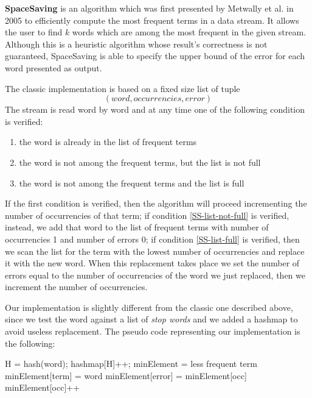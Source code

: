 \textbf{SpaceSaving} \cite{SS} is an algorithm which was first presented by Metwally et al.
in 2005 to efficiently compute the most frequent terms in a data stream. It
allows the user to find $k$ words which are among the most frequent in the given
stream. 
Although this is a heuristic algorithm whose result’s correctness is not guaranteed, SpaceSaving is able to specify the upper bound of the error for each word presented as output.

The classic implementation is based on a fixed size list of tuple 
\begin{displaymath}
	(word, occurrencies, error)
\end{displaymath}
The stream is read word by word and at any time one of the following condition
is verified:
\begin{enumerate}
	\item \label{SS-among-frequent}
		the word is already in the list of frequent terms
	\item \label{SS-list-not-full}
		the word is not among the frequent terms, but the list is not full
	\item \label{SS-list-full}
		the word is not among the frequent terms and the list is full
\end{enumerate}
If the first condition is verified, then the algorithm will proceed incrementing
the number of occurrencies of that term; if condition \ref{SS-list-not-full} is
verified, instead, we add that word to the list of frequent terms with number of
occurrencies 1 and number of errors 0; if condition \ref{SS-list-full} is
verified, then we scan the list for the term with the lowest number of
occurrencies and replace it with the new word. When this replacement takes place
we set the number of errors equal to the number of occurrencies of the word we
just replaced, then we increment the number of occurrencies.

Our implementation is slightly different from the
classic one described above, since we test the word against a list of \emph{stop words}
and we added a hashmap to avoid useless replacement. The pseudo code representing
our implementation is the following:

\begin{algorithmic}
	\STATE H = hash(word);
	\STATE hashmap[H]++;
	    \STATE minElement = less frequent term
    	\STATE minElement[term] = word
    	\STATE minElement[error] = minElement[occ]
	    \STATE minElement[occ]++
	\ENDIF
	\ENDIF
\end{algorithmic}

